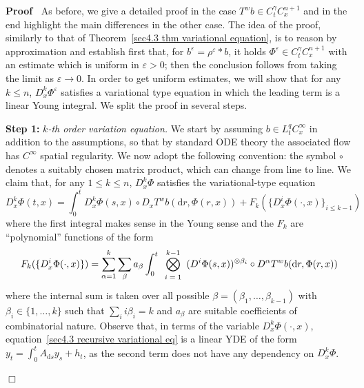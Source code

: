\documentclass[10pt]{article}
\newcommand{\mathd}{\mathrm{d}}
\newcommand{\nobracket}{}
\newcommand{\tmcolor}[2]{{\color{#1}{#2}}}
\newcommand{\tmscript}[1]{\text{\scriptsize{$#1$}}}
\newcommand{\tmstrong}[1]{\textbf{#1}}
\newcommand{\tmtextit}[1]{{\itshape{#1}}}
\newenvironment{proof}{\noindent\textbf{Proof\ }}{\hspace*{\fill}$\Box$\medskip}
\begin{document}
\begin{proof}
  As before, we give a detailed proof in the case $T^w b \in C^{\gamma}_t C^{n
  + 1}_x$ and in the end highlight the main differences in the other case. The
  idea of the proof, similarly to that of Theorem~\ref{sec4.3 thm variational
  equation}, is to reason by approximation and establish first that, for
  $b^{\varepsilon} = \rho^{\varepsilon} \ast b$, it holds $\Phi^{\varepsilon}
  \in C^{\gamma}_t C_x^{n + 1}$ with an estimate which is uniform in
  $\varepsilon > 0$; then the conclusion follows from taking the limit as
  $\varepsilon \rightarrow 0$. In order to get uniform estimates, we will show
  that for any $k \leqslant n$, $D^k_x \Phi^{\varepsilon}$ satisfies a
  variational type equation in which the leading term is a linear Young
  integral. We split the proof in several steps.
  
  {\tmstrong{Step 1:}} \tmtextit{$k$\mbox{-}th order variation equation.} We
  start by assuming $b \in L^q_t C^{\infty}_x$ in addition to the assumptions,
  so that by standard ODE theory the associated flow has $C^{\infty}$ spatial
  regularity. We now adopt the following convention: the symbol $\circ$
  denotes a suitably chosen matrix product, which can change from line to
  line. We claim that, for any $1 \leqslant k \leqslant n$, $D^k_x \Phi$
  satisfies the variational-type equation
  \begin{equation}
    D^k_x \Phi (t, x) = \int_0^t D^k_x \Phi (s, x) \circ \nobracket D_x T^w b
    (\mathd r, \Phi (r, x) \nobracket) + F_k (\{ D_x^i \Phi (\cdot, x) \}_{i
    \leqslant k - 1}) \label{sec4.3 recursive variational eq}
  \end{equation}
  where the first integral makes sense in the Young sense and the $F_k$ are
  ``polynomial'' functions of the form
  \[ F_k (\{ D_x^i \Phi (\cdot, x) \}) = \sum_{\alpha = 1}^k \sum_{\beta}
     a_{\beta} \int_0^t \bigotimes^{k - 1}_{\tmscript{\begin{array}{c}
       i = 1
     \end{array}}} (D^i \Phi (s, x))^{\otimes \beta_i} \circ \nobracket
     D^{\alpha} T^w b (\mathd r, \Phi (r, x) \nobracket) \tmcolor{blue}{} \]
  where the internal sum is taken over all possible $\beta = (\beta_1, \ldots,
  \beta_{k - 1})$ with $\beta_i \in \{ 1, \ldots, k \}$ such that $\sum_i i
  \beta_i = k$ and $a_{\beta}$ are suitable coefficients of combinatorial
  nature. Observe that, in terms of the variable $D^k_x \Phi (\cdot, x)$,
  equation~{\eqref{sec4.3 recursive variational eq}} is a linear YDE of the
  form $y_t = \int_0^t A_{\mathd s} y_s + h_t$, as the second term does not
  have any dependency on $D^k_x \Phi$.
  

\end{proof}
\end{document}
